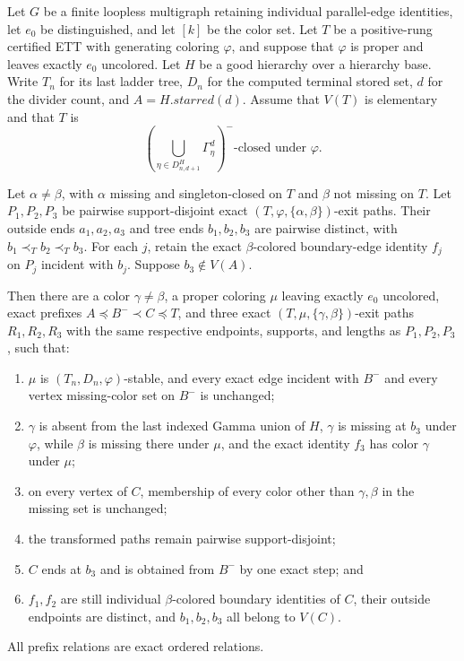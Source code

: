 \begin{lemma}
Let $G$ be a finite loopless multigraph retaining individual parallel-edge
identities, let $e_0$ be distinguished, and let $[k]$ be the color set.
Let $T$ be a positive-rung certified ETT with generating coloring
$\varphi$, and suppose that $\varphi$ is proper and leaves exactly $e_0$
uncolored.  Let $H$ be a good hierarchy over a hierarchy base.  Write
$T_n$ for its last ladder tree, $D_n$ for the computed terminal stored set,
$d$ for the divider count, and $A=H.\mathit{starred}(d)$.  Assume that
$V(T)$ is elementary and that $T$ is
\[
 \left(\bigcup_{\eta\in D^H_{n,d+1}}\Gamma^d_\eta\right)^-
 \text{-closed under }\varphi.
\]

Let $\alpha\ne\beta$, with $\alpha$ missing and singleton-closed on $T$
and $\beta$ not missing on $T$.  Let $P_1,P_2,P_3$ be pairwise
support-disjoint exact $(T,\varphi,\{\alpha,\beta\})$-exit paths.  Their
outside ends $a_1,a_2,a_3$ and tree ends $b_1,b_2,b_3$ are pairwise
distinct, with $b_1\prec_Tb_2\prec_Tb_3$.  For each $j$, retain the exact
$\beta$-colored boundary-edge identity $f_j$ on $P_j$ incident with $b_j$.
Suppose $b_3\notin V(A)$.

Then there are a color $\gamma\ne\beta$, a proper coloring $\mu$ leaving
exactly $e_0$ uncolored, exact prefixes $A\preccurlyeq B^-\prec
C\preccurlyeq T$, and three exact
$(T,\mu,\{\gamma,\beta\})$-exit paths $R_1,R_2,R_3$ with the same
respective endpoints, supports, and lengths as $P_1,P_2,P_3$, such that:
\begin{enumerate}
\item $\mu$ is $(T_n,D_n,\varphi)$-stable, and every exact edge incident
with $B^-$ and every vertex missing-color set on $B^-$ is unchanged;
\item $\gamma$ is absent from the last indexed Gamma union of $H$,
$\gamma$ is missing at $b_3$ under $\varphi$, while $\beta$ is missing
there under $\mu$, and the exact identity $f_3$ has color $\gamma$ under
$\mu$;
\item on every vertex of $C$, membership of every color other than
$\gamma,\beta$ in the missing set is unchanged;
\item the transformed paths remain pairwise support-disjoint;
\item $C$ ends at $b_3$ and is obtained from $B^-$ by one exact
 step; and
\item $f_1,f_2$ are still individual $\beta$-colored boundary identities
of $C$, their outside endpoints are distinct, and $b_1,b_2,b_3$ all
belong to $V(C)$.
\end{enumerate}
All prefix relations are exact ordered
 relations.
\end{lemma}
